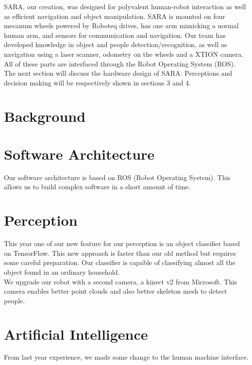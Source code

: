 \documentclass[runningheads,a4paper]{llncs}
\begin{document}
SARA, our creation, was designed for polyvalent human-robot interaction as well as efficient navigation and object manipulation. SARA is mounted on four mecanum wheels powered by Roboteq drives, has one arm mimicking a normal human arm, and sensors for communication and navigation. Our team has developed knowledge in object and people detection/recognition, as well as navigation using a laser scanner, odometry on the wheels and a XTION camera. All of these parts are interfaced through the Robot Operating System (ROS). \\

The next section will discuss the hardware design of SARA. Perceptions and decision making will be respectively shown in sections 3 and 4.


\section{Background}
\lipsum[1-3]

\section{Software Architecture}
\tab Our software architecture is based on ROS (Robot Operating System). This allows us to build complex software in a short amount of time. 

\section{Perception}

\tab This year one of our new feature for our perception is an object classifier based on TensorFlow. This new approach is faster than our old method but requires some careful preparation. Our classifier is capable of classifying almost all the object found in an ordinary household. \\

We upgrade our robot with a second camera, a kinect v2 from Microsoft. This camera enables better point clouds and also better skeleton mesh to detect people. \\

\section{Artificial Intelligence}
\tab From last year experience, we made some change to the human machine interface. \\
\end{document}
